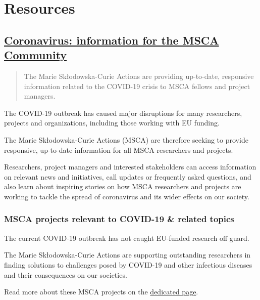 \documentclass[oneside]{book}
\numberwithin{equation}{section}
\begin{document}
\section{Resources}

\subsection{\href{https://ec.europa.eu/research/mariecurieactions/resources/corona-information-MSCA_en}{Coronavirus: information for the MSCA Community}}
\begin{quotation}
    The Marie Skłodowska-Curie Actions are providing up-to-date, responsive information related to the COVID-19 crisis to MSCA fellows and project managers.
\end{quotation}
The COVID-19 outbreak has caused major disruptions for many researchers, projects and organizations, including those working with EU funding.

The Marie Skłodowska-Curie Actions (MSCA) are therefore seeking to provide responsive, up-to-date information for all MSCA researchers and projects.

%
Researchers, project managers and interested stakeholders can access information on relevant news and initiatives, call updates or frequently asked questions, and also learn about inspiring stories on how MSCA researchers and projects are working to tackle the spread of coronavirus and its wider effects on our society.

\subsubsection{MSCA projects relevant to COVID-19 \& related topics}
The current COVID-19 outbreak has not caught EU-funded research off guard.

The Marie Skłodowska-Curie Actions are supporting outstanding researchers in finding solutions to challenges posed by COVID-19 and other infectious diseases and their consequences on our societies.

%
Read more about these MSCA projects on the \href{https://ec.europa.eu/research/mariecurieactions/msca-projects-researching-covid-19-sars-cov-2-and-related-topics_en}{dedicated page}.
\end{document}
